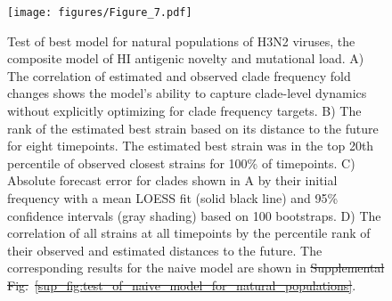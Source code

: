 \documentclass[9pt,lineno]{elife} %
\providecommand{\DIFadd}[1]{{\protect\color{blue}\uwave{#1}}} %
\providecommand{\DIFdel}[1]{{\protect\color{red}\sout{#1}}}                      %
\providecommand{\DIFdelbegin}{} %
\providecommand{\DIFaddFL}[1]{\DIFadd{#1}} %
\providecommand{\DIFdelFL}[1]{\DIFdel{#1}} %
\providecommand{\DIFaddbeginFL}{} %
\providecommand{\DIFaddendFL}{} %
\providecommand{\DIFdelbeginFL}{} %
\providecommand{\DIFdelendFL}{} %
\providecommand{\DIFaddtex}[1]{{\protect\color{blue}\uwave{#1}}} %
\providecommand{\DIFdeltex}[1]{{\protect\color{red}\sout{#1}}}                      %
\providecommand{\DIFdelbegin}{} %
\providecommand{\DIFaddFL}[1]{\DIFadd{#1}} %
\providecommand{\DIFdelFL}[1]{\DIFdel{#1}} %
\providecommand{\DIFaddbeginFL}{} %
\providecommand{\DIFaddendFL}{} %
\providecommand{\DIFdelbeginFL}{} %
\providecommand{\DIFdelendFL}{} %
\providecommand{\DIFadd}[1]{\texorpdfstring{\DIFaddtex{#1}}{#1}} %
\providecommand{\DIFdel}[1]{\texorpdfstring{\DIFdeltex{#1}}{}} %
\newcommand{\DIFscaledelfig}{0.5}
\newlength{\DIFdelgraphicswidth} %
\newlength{\DIFdelgraphicsheight} %
\newcommand{\DIFaddincludegraphics}[2][]{{\color{blue}\fbox{\DIFOincludegraphics[#1]{#2}}}} %
\newcommand{\DIFdelincludegraphics}[2][]{%
\sbox{\DIFdelgraphicsbox}{\DIFOincludegraphics[#1]{#2}}%
\settoboxwidth{\DIFdelgraphicswidth}{\DIFdelgraphicsbox} %
\settoboxtotalheight{\DIFdelgraphicsheight}{\DIFdelgraphicsbox} %
\scalebox{\DIFscaledelfig}{%
\parbox[b]{\DIFdelgraphicswidth}{\usebox{\DIFdelgraphicsbox}\\[-\baselineskip] \rule{\DIFdelgraphicswidth}{0em}}\llap{\resizebox{\DIFdelgraphicswidth}{\DIFdelgraphicsheight}{%
\setlength{\unitlength}{\DIFdelgraphicswidth}%
\begin{picture}(1,1)%
\thicklines\linethickness{2pt} %
{\color[rgb]{1,0,0}\put(0,0){\framebox(1,1){}}}%
{\color[rgb]{1,0,0}\put(0,0){\line( 1,1){1}}}%
{\color[rgb]{1,0,0}\put(0,1){\line(1,-1){1}}}%
\end{picture}%
}\hspace*{3pt}}} %
} %
\DeclareRobustCommand{\DIFdelbegin}{\DIFOdelbegin \let\includegraphics\DIFdelincludegraphics} %
\DeclareRobustCommand{\DIFaddbeginFL}{\DIFOaddbeginFL \let\includegraphics\DIFaddincludegraphics} %
\DeclareRobustCommand{\DIFaddendFL}{\DIFOaddendFL \let\includegraphics\DIFOincludegraphics} %
\DeclareRobustCommand{\DIFdelbeginFL}{\DIFOdelbeginFL \let\includegraphics\DIFdelincludegraphics} %
\DeclareRobustCommand{\DIFdelendFL}{\DIFOaddendFL \let\includegraphics\DIFOincludegraphics} %
\begin{document}
\DIFdelbegin %
\DIFdelendFL \DIFaddbeginFL \begin{figure}
  \texttt{[image: figures/Figure\_7.pdf]}
  \DIFaddendFL \caption{
  Test of best model for natural populations of H3N2 viruses, the composite model of HI antigenic novelty and mutational load.
  A) The correlation of estimated and observed clade frequency fold changes shows the model's ability to capture clade-level dynamics without explicitly optimizing for clade frequency targets.
  B) The rank of the estimated best strain based on its distance to the future for eight timepoints.
  The estimated best strain was in the top 20th percentile of observed closest strains for 100\% of timepoints.
  C) Absolute forecast error for clades shown in A by their initial frequency with a mean LOESS fit (solid black line) and 95\% confidence intervals (gray shading) based on 100 bootstraps.
  D) The correlation of all strains at all timepoints by the percentile rank of their observed and estimated distances to the future.
  The corresponding results for the naive model are shown in \DIFdelbeginFL \DIFdelFL{Supplemental Fig.}\DIFdelendFL \DIFaddbeginFL \DIFaddFL{Figure}\DIFaddendFL ~\DIFdelbeginFL \DIFdelFL{\ref{sup_fig:test_of_naive_model_for_natural_populations}}\DIFdelendFL \DIFaddbeginFL \DIFaddFL{\ref{fig:test_of_best_model_for_natural_populations}-Figure supplement~\ref{figsupp:test_of_naive_model_for_natural_populations}}\DIFaddendFL .
  }
  \label{fig:test_of_best_model_for_natural_populations}
\DIFdelbeginFL %
\DIFdelendFL \DIFaddbeginFL 


\end{figure}
\end{document}
